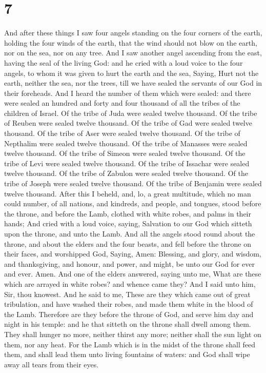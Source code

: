 \hypertarget{section-6}{%
\section{7}\label{section-6}}

 And after these things I saw four angels standing on the
four corners of the earth, holding the four winds of the earth, that the
wind should not blow on the earth, nor on the sea, nor on any tree.
 And I saw another angel ascending from the east, having
the seal of the living God: and he cried with a loud voice to the four
angels, to whom it was given to hurt the earth and the sea,
 Saying, Hurt not the earth, neither the sea, nor the
trees, till we have sealed the servants of our God in their foreheads.
 And I heard the number of them which were sealed: and
there were sealed an hundred and forty and four thousand of all the
tribes of the children of Israel.  Of the tribe of Juda
were sealed twelve thousand. Of the tribe of Reuben were sealed twelve
thousand. Of the tribe of Gad were sealed twelve thousand.
 Of the tribe of Aser were sealed twelve thousand. Of the
tribe of Nepthalim were sealed twelve thousand. Of the tribe of Manasses
were sealed twelve thousand.  Of the tribe of Simeon were
sealed twelve thousand. Of the tribe of Levi were sealed twelve
thousand. Of the tribe of Issachar were sealed twelve thousand.
 Of the tribe of Zabulon were sealed twelve thousand. Of
the tribe of Joseph were sealed twelve thousand. Of the tribe of
Benjamin were sealed twelve thousand.  After this I
beheld, and, lo, a great multitude, which no man could number, of all
nations, and kindreds, and people, and tongues, stood before the throne,
and before the Lamb, clothed with white robes, and palms in their hands;
 And cried with a loud voice, saying, Salvation to our
God which sitteth upon the throne, and unto the Lamb. 
And all the angels stood round about the throne, and about the elders
and the four beasts, and fell before the throne on their faces, and
worshipped God,  Saying, Amen: Blessing, and glory, and
wisdom, and thanksgiving, and honour, and power, and might, be unto our
God for ever and ever. Amen.  And one of the elders
answered, saying unto me, What are these which are arrayed in white
robes? and whence came they?  And I said unto him, Sir,
thou knowest. And he said to me, These are they which came out of great
tribulation, and have washed their robes, and made them white in the
blood of the Lamb.  Therefore are they before the throne
of God, and serve him day and night in his temple: and he that sitteth
on the throne shall dwell among them.  They shall hunger
no more, neither thirst any more; neither shall the sun light on them,
nor any heat.  For the Lamb which is in the midst of the
throne shall feed them, and shall lead them unto living fountains of
waters: and God shall wipe away all tears from their eyes.

